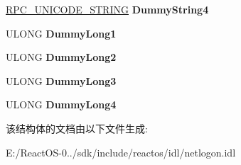 \begin{DoxyCompactItemize}
\hyperlink{struct___r_p_c___u_n_i_c_o_d_e___s_t_r_i_n_g}{R\+P\+C\+\_\+\+U\+N\+I\+C\+O\+D\+E\+\_\+\+S\+T\+R\+I\+NG} {\bfseries Dummy\+String4}
\item 
\mbox{\label{struct___n_e_t_l_o_g_o_n___d_e_l_t_a___d_e_l_e_t_e___u_s_e_r_a79f2c9e7ce0a2db82163564f336e9960}} 
U\+L\+O\+NG {\bfseries Dummy\+Long1}
\item 
\mbox{\label{struct___n_e_t_l_o_g_o_n___d_e_l_t_a___d_e_l_e_t_e___u_s_e_r_a66f9e5adc35c7e39011b390417cab8f5}} 
U\+L\+O\+NG {\bfseries Dummy\+Long2}
\item 
\mbox{\label{struct___n_e_t_l_o_g_o_n___d_e_l_t_a___d_e_l_e_t_e___u_s_e_r_a7c8188d215a2a9ca2b94464c9f570835}} 
U\+L\+O\+NG {\bfseries Dummy\+Long3}
\item 
\mbox{\label{struct___n_e_t_l_o_g_o_n___d_e_l_t_a___d_e_l_e_t_e___u_s_e_r_ac12260a28b4aebd0a7e88275202412c3}} 
U\+L\+O\+NG {\bfseries Dummy\+Long4}
\end{DoxyCompactItemize}


该结构体的文档由以下文件生成\+:\begin{DoxyCompactItemize}
\item 
E\+:/\+React\+O\+S-\/0../sdk/include/reactos/idl/netlogon.\+idl\end{DoxyCompactItemize}
